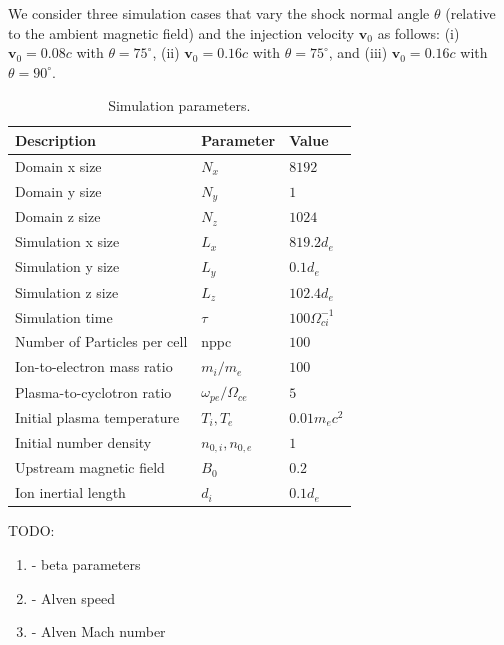 \documentclass[final,5p,times,twocolumn,authoryear, draft]{elsarticle}
\begin{document}
We consider three simulation cases that vary the shock normal angle $\theta$ (relative to the ambient magnetic field) and the injection velocity $\bm{v}_0$ as follows: (i) $\bm{v}_0 = 0.08c$ with $\theta = 75^\circ$, (ii) $\bm{v}_0 = 0.16c$ with $\theta = 75^\circ$, and (iii) $\bm{v}_0 = 0.16c$ with $\theta = 90^\circ$.



\begin{table}[h!]
	\centering
	\caption{Simulation parameters.}
	\setlength{\tabcolsep}{3pt} %
	\begin{tabular}{p{} ll}
		\hline
		Description & Parameter & Value \\ \hline
		Domain x size    & $N_x$                       & $8192$          \\
		Domain y size    & $N_y$                       & $1$             \\
		Domain z size    & $N_z$                       & $1024$          \\
		Simulation x size & $L_x$                     & $819.2 d_e$     \\
		Simulation y size & $L_y$                     & $0.1 d_e$       \\
		Simulation z size & $L_z$                     & $102.4 d_e$     \\
		Simulation time     & $\tau$                      & $100 \Omega_{ci}^{-1}$ \\
		Number of Particles per cell        & nppc               & $100$           \\
		Ion-to-electron mass ratio & $m_i / m_e$                & $100$           \\
		Plasma-to-cyclotron ratio & $\omega_{pe} / \Omega_{ce}$ & $5$    \\
		Initial plasma temperature & $T_i, T_e$                 & $0.01 m_e c^2$  \\
		Initial number density    & $n_{0,i}, n_{0,e}$          & $1$             \\
		Upstream magnetic field   & $B_0$                       & $0.2$           \\ 
		Ion inertial length   & $d_i$                       & $0.1 d_e$           \\
		\hline
	\end{tabular}
\end{table}

TODO:
\begin{enumerate}
	\item - beta parameters
	\item - Alven speed
	\item - Alven Mach number
\end{enumerate}
\end{document}
